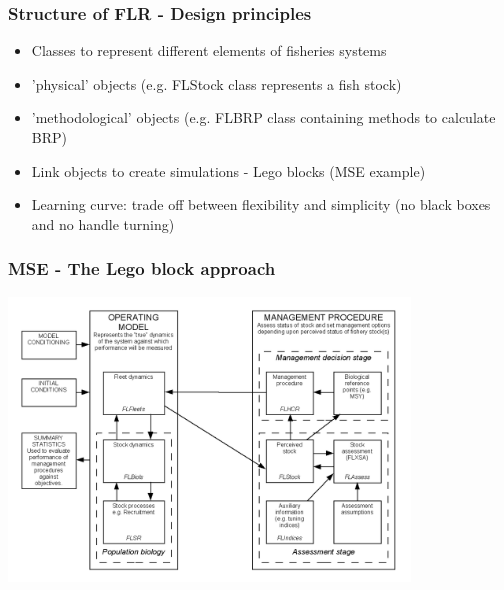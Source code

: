 \documentclass{beamer}%
\begin{document}
\begin{frame}
   \frametitle{Structure of FLR - Design principles}
      \begin{itemize}
	 \item<2-> Classes to represent different elements of fisheries systems
	 \item<3-> 'physical' objects (e.g. FLStock class represents a fish stock)
	 \item<4-> 'methodological' objects (e.g. FLBRP class containing methods to calculate BRP)
	 \item<5-> Link objects to create simulations - Lego blocks (MSE example)
	 \item<6-> Learning curve: trade off between flexibility and simplicity (no black boxes and no handle turning)
      \end{itemize}
\end{frame}

\begin{frame}
  \frametitle{MSE - The Lego block approach}
   \begin{center}
      \includegraphics[width=0.8\textwidth]{MSE.png}
   \end{center}
\end{frame}

\end{document}
